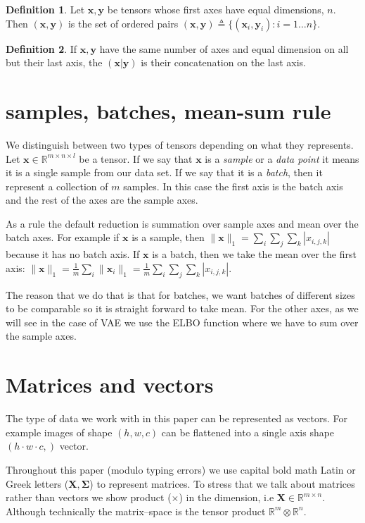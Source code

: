 \documentclass[11pt, a4paper]{report}
\theoremstyle{plain}
\theoremstyle{definition}
\newtheorem{mydef}{Definition}[chapter]
\theoremstyle{remark}
\newcommand{\R}{\mathbb{R}}
\newcommand{\x}{\mathbf{x}}
\newcommand{\y}{\mathbf{y}}
\newcommand{\bv}[1]{\boldsymbol{#1}}
\begin{document}
\begin{mydef}
\label{def:pairnotaion}
Let $\x, \y$ be tensors whose first axes have equal dimensions, $n$. Then $(\x, \y)$
is the set of ordered pairs $(\x,\y) \triangleq \{(\x_i,\y_i) : i=1 \dots n\}$.
\end{mydef}

\begin{mydef}
\label{def:concat}
If $\x,\y$ have the same number of axes and equal dimension on all but their last axis, 
the $(\x|\y)$ is their concatenation on the last axis. 
\end{mydef}

\section{samples, batches, mean-sum rule}

We distinguish between two types of tensors depending on what they represents.
Let $\x \in \R^{m \times n \times l}$ be a tensor.
If we say that $\x$ is a \emph{sample} or a \emph{data point} it means it is a
single sample from our data set. If we say that it is a \emph{batch}, then 
it represent a collection of $m$ samples. In this case the first axis is the batch
axis and the rest of the axes are the sample axes.

As a rule the default reduction is summation over sample axes 
and mean over the batch axes.
For example if $\x$ is a sample, 
then $\|\x \|_1 = \sum_i \sum_j \sum_k |x_{i,j,k}|$ because it has no batch axis.
If $\x$ is a batch, then we take the mean over the first axis:
$\| \x \|_1 = \frac{1}{m} \sum_i \| \x_i \|_1 = \frac{1}{m} \sum_i \sum_j \sum_k |x_{i,j,k}|$.

The reason that we do that is that for batches, we want batches of different
sizes to be comparable so it is straight forward to take mean. For the other
axes, as we will see in the case of VAE we use the ELBO function where we have
to sum over the sample axes.

\label{meansumrule}


\section{Matrices and vectors}

The type of data we work with in this paper can be represented as vectors.
For example images of shape $(h,w,c)$ can be flattened into a single axis shape
$(h \cdot w \cdot c,)$ vector.

Throughout this paper (modulo typing errors) we use
capital bold math Latin or Greek letters ($\bv{X, \Sigma}$) to represent
matrices. To stress that we talk about matrices rather than vectors we show
product ($\times$) in the dimension, i.e $\bv{X} \in \R^{m \times n}$. Although
technically the matrix--space is the tensor product $\R^m \otimes \R^n$.
\end{document}
